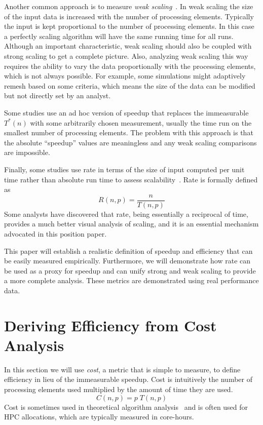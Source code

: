 \documentclass[conference]{IEEEtran}
\newcommand*{\lcite}[1]{~\cite{#1}}
\newcommand*{\keyterm}[1]{\emph{#1}}
\begin{document}
Another common approach is to measure \keyterm{weak scaling}\lcite{Kaminsky2014}.
In weak scaling the size of the input data is increased with the number of
processing elements. Typically the input is kept proportional to the number
of processing elements. In this case a perfectly scaling algorithm will
have the same running time for all runs. Although an important
characteristic, weak scaling should also be coupled with strong scaling to
get a complete picture. Also, analyzing weak scaling this way requires the
ability to vary the data proportionally with the processing elements, which
is not always possible.  For example, some simulations might adaptively
remesh based on some criteria, which means the size of the data can be
modified but not directly set by an analyst.

Some studies use an ad hoc version of speedup that replaces the
immeasurable $T^*(n)$ with some arbitrarily chosen measurement, usually the
time run on the smallest number of processing elements. The problem with
this approach is that the absolute ``speedup'' values are meaningless and
any weak scaling comparisons are impossible.

Finally, some studies use rate in terms of the size of input computed per
unit time rather than absolute run time to assess
scalability\lcite{Kaminsky2014}. Rate is formally defined as
\begin{equation}
  R(n,p) = \frac{n}{T(n,p)}
  \label{eq:Rate}
\end{equation}
Some analysts have discovered that rate, being essentially a reciprocal of
time, provides a much better visual analysis of scaling, and it is
an essential mechanism advocated in this position paper.

This paper will establish a realistic definition of speedup and efficiency
that can be easily measured empirically. Furthermore, we will demonstrate
how rate can be used as a proxy for speedup and can unify strong and weak
scaling to provide a more complete analysis. These metrics are demonstrated
using real performance data.


\section{Deriving Efficiency from Cost Analysis}
\label{sec:CostAnalysis}

\noindent
In this section we will use \keyterm{cost}, a metric that is simple to
measure, to define efficiency in lieu of the immeasurable speedup. Cost is
intuitively the number of processing elements used multiplied by the amount
of time they are used.
\begin{equation}
  C(n,p) = p \; T(n,p)
  \label{eq:Cost}
\end{equation}
Cost is sometimes used in theoretical algorithm analysis\lcite{JaJa1992}
and is often used for HPC allocations, which are typically measured in
core-hours.
\end{document}
